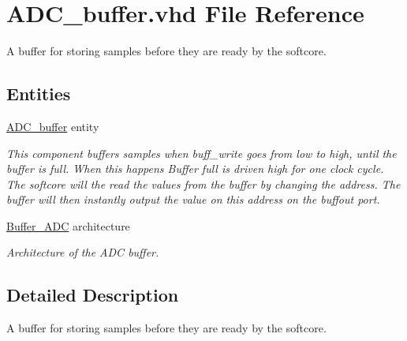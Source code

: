 \hypertarget{ADC__buffer_8vhd}{\section{A\-D\-C\-\_\-buffer.\-vhd File Reference}
\label{ADC__buffer_8vhd}
}


A buffer for storing samples before they are ready by the softcore.  


\subsection*{Entities}
\begin{DoxyCompactItemize}
\item 
\hyperlink{classADC__buffer}{A\-D\-C\-\_\-buffer} entity
\begin{DoxyCompactList}\small\item\em This component buffers samples when buff\-\_\-write goes from low to high, until the buffer is full. When this happens Buffer full is driven high for one clock cycle. The softcore will the read the values from the buffer by changing the address. The buffer will then instantly output the value on this address on the buffout port. \end{DoxyCompactList}\item 
\hyperlink{classADC__buffer_1_1Buffer__ADC}{Buffer\-\_\-\-A\-D\-C} architecture
\begin{DoxyCompactList}\small\item\em Architecture of the A\-D\-C buffer. \end{DoxyCompactList}\end{DoxyCompactItemize}


\subsection{Detailed Description}
A buffer for storing samples before they are ready by the softcore. 